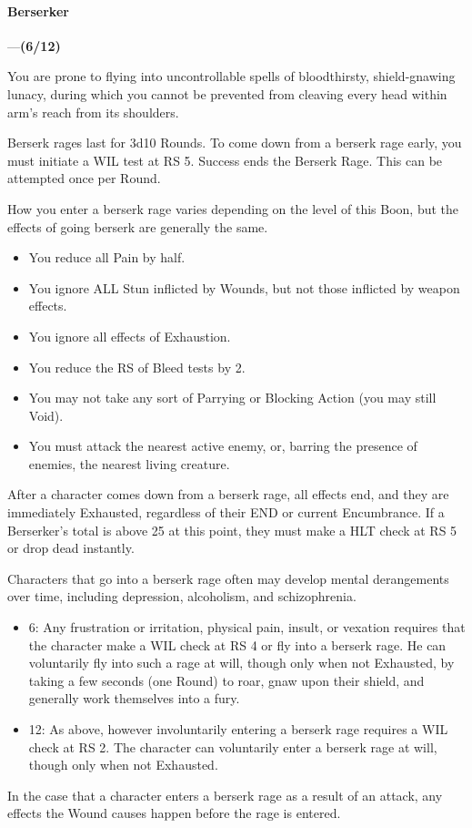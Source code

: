 \documentclass[oneside,11pt,english]{book}
\begin{document}
\paragraph{\label{boon:Berserker}Berserker}---\quad \textbf{(6/12)}\par
You are prone to flying into uncontrollable spells of bloodthirsty, shield-gnawing lunacy, during which 
you cannot be prevented from cleaving every head within arm's reach from its shoulders. 

Berserk rages last for 3d10 Rounds. To come down from a berserk rage early, you must initiate a WIL 
test at RS 5. Success ends the Berserk Rage. This can be attempted once per Round. 

How you enter a berserk rage varies depending on the level of this Boon, but the effects of going berserk are generally the same. 
\begin{itemize}
\item You reduce all Pain by half. 
\item You ignore ALL Stun inflicted by Wounds, but not those inflicted by weapon effects. 
\item You ignore all effects of Exhaustion. 
\item You reduce the RS of Bleed tests by 2. 
\item You may not take any sort of Parrying or Blocking Action (you may still Void). 
\item You must attack the nearest active enemy, or, barring the presence of enemies, the nearest living 
creature. 
\end{itemize}
After a character comes down from a berserk rage, all effects end, and they are immediately Exhausted, 
regardless of their END or current Encumbrance. If a Berserker's  total is above 25 at this 
point, they must make a HLT check at RS 5 or drop dead instantly. 


Characters that go into a berserk rage often may develop mental derangements over time, including 
depression, alcoholism, and schizophrenia. 
\begin{itemize}
\item 6: Any frustration or irritation, physical pain, insult, or vexation requires that the character make a WIL check at RS 4 or fly into a berserk rage. He can voluntarily fly into such a rage at will, though only when not Exhausted, by taking a few seconds (one Round) to roar, gnaw upon their shield, and generally work 
themselves into a fury.
\item 12: As above, however involuntarily entering a berserk rage requires a WIL check at RS 2. The character can voluntarily enter a berserk rage at will, though only when not Exhausted.
\end{itemize}
In the case that a character enters a berserk rage as a result of an attack, any effects the Wound causes happen before the rage is entered.
\end{document}
